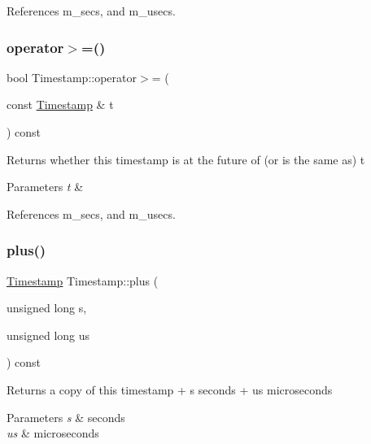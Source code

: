 References m\+\_\+secs, and m\+\_\+usecs.

\mbox{\label{classDUtils_1_1Timestamp_ade494d1dad26c52bf93c189342a1a69a}} 
\subsubsection{\texorpdfstring{operator$>$=()}{operator>=()}}
{\footnotesize\ttfamily bool Timestamp\+::operator$>$= (\begin{DoxyParamCaption}\item[{const \hyperlink{classDUtils_1_1Timestamp}{Timestamp} \&}]{t }\end{DoxyParamCaption}) const}

Returns whether this timestamp is at the future of (or is the same as) t 
\begin{DoxyParams}{Parameters}
{\em t} & \\
\hline
\end{DoxyParams}


References m\+\_\+secs, and m\+\_\+usecs.

\mbox{\label{classDUtils_1_1Timestamp_aaee4b5b30d2130e622636350c1332fcf}} 
\subsubsection{\texorpdfstring{plus()}{plus()}}
{\footnotesize\ttfamily \hyperlink{classDUtils_1_1Timestamp}{Timestamp} Timestamp\+::plus (\begin{DoxyParamCaption}\item[{unsigned long}]{s,  }\item[{unsigned long}]{us }\end{DoxyParamCaption}) const}

Returns a copy of this timestamp + s seconds + us microseconds 
\begin{DoxyParams}{Parameters}
{\em s} & seconds \\
\hline
{\em us} & microseconds \\
\hline
\end{DoxyParams}


